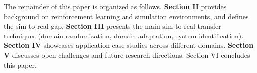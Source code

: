 The remainder of this paper is organized as follows. \textbf{Section II} provides background on reinforcement learning and simulation environments, and defines the sim-to-real gap. \textbf{Section III} presents the main sim-to-real transfer techniques (domain randomization, domain adaptation, system identification). \textbf{Section IV} showcases application case studies across different domains. \textbf{Section V} discusses open challenges and future research directions. Section VI concludes this paper.